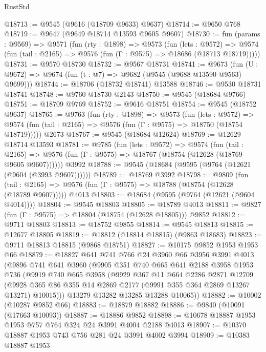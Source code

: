 \begin{lexlean}{RustStd}
\begin{coremodule}
@18713 := @9545 (@9616 (@18709 @9633) @9637)
@18714 := @9650 @768
@18719 := @9647 (@9649 @18714 @13593 @9605 @9607)
@18730 := fun (params : @9569) =>
  @9571
    (fun (rty : @1898) =>
    @9573
      (fun (lets : @9572) =>
      @9574 (fun (tail : @2165) => @9576 (fun (Γ : @9575) => @18686 (@18713 @18719)))))
@18731 := @9570 @18730
@18732 := @9567 @18731
@18741 := @9673
    (fun (U : @9672) => @9674 (fun (t : @7) => @9682 (@9545 (@9688 @13590 @9563) @9699)))
@18744 := @18706 (@18732 @18741) @13588
@18746 := @9530 @18731 @18741
@18748 := @9760 @18730 @2143
@18750 := @9545 (@18684 @9766)
@18751 := @18709 @9769
@18752 := @9616 @18751
@18754 := @9545 (@18752 @9637)
@18765 := @9763
    (fun (rty : @1898) =>
    @9573
      (fun (lets : @9572) =>
      @9574 (fun (tail : @2165) => @9576 (fun (Γ : @9575) => @18750 (@18754 @18719)))))
    @2673
@18767 := @9545 (@18684 @12624)
@18769 := @12629 @18714 @13593
@18781 := @9785
    (fun (lets : @9572) =>
    @9574
      (fun (tail : @2165) =>
      @9576 (fun (Γ : @9575) => @18767 (@18754 (@12628 (@18769 @9605 @9607))))))
    @3992
@18788 := @9545 (@18684 (@9595 (@9764 (@12621 (@9604 (@3993 @9607))))))
@18789 := @18769 @3992
@18798 := @9809
    (fun (tail : @2165) => @9576 (fun (Γ : @9575) => @18788 (@18754 (@12628 (@18789 @9607)))))
    @4013
@18803 := @18684 (@9595 (@9764 (@12621 (@9604 @4014))))
@18804 := @9545 @18803
@18805 := @18789 @4013
@18811 := @9827 (fun (Γ : @9575) => @18804 (@18754 (@12628 @18805))) @9852
@18812 := @9711 @18803
@18813 := @18752 @9855
@18814 := @9545 @18813
@18815 := @12677 @18805
@18819 := @18812 (@18814 @18815) (@9863 @18683)
@18823 := @9711 @18813 @18815 (@9868 @18751)
@18827 := @10175 @9852 @1953 @1953 @66
@18879 := @18827
    @641
    @741
    @766
    @24
    @3960
    @66
    @3956
    @3991
    @4013
    (@9896
      @741
      @641
      @3960
      (@9905
        @351
        @740
        @665
        @641
        @2188
        @3958
        @1953
        @736
        (@9919
          @740
          @665
          @3958
          (@9929
            @367
            @11
            @664
            @2286
            @2871
            @12709
            (@9928 @365 @86 @355 @14 @2869 @2177 (@9991 @355 @364 @2869 @13267 @13271) @10015)))
        @13279
        @13282
        @13285
        @13288
        @10065))
@18882 := @10002 (@10287 @9852 @66)
@18883 := @18879 @18882
@18886 := @9840 (@10091 (@17663 @10093))
@18887 := @18886 @9852
@18898 := @10678 @18887 @1953 @1953 @757 @764 @324 @24 @3991 @4004 @2188 @4013
@18907 := @10370 @18887 @1953 @743 @756 @281 @24 @3991 @4002 @3994
@18909 := @10383 @18887 @1953

\end{coremodule}
\end{lexlean}
